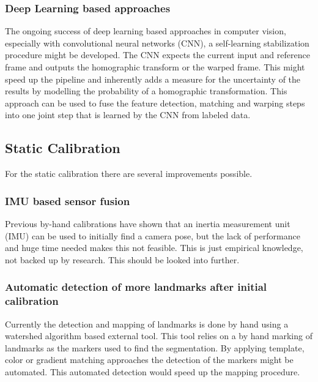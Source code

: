 \subsubsection{Deep Learning based approaches}
The ongoing success of deep learning based approaches in computer vision, especially with convolutional neural networks (CNN), a self-learning stabilization procedure might be developed.
The CNN expects the current input and reference frame and outputs the homographic transform or the warped frame. 
This might speed up the pipeline and inherently adds a measure for the uncertainty of the results by modelling the probability of a homographic transformation.
This approach can be used to fuse the feature detection, matching and warping steps into one joint step that is learned by the CNN from labeled data.


\subsection{Static Calibration}
For the static calibration there are several improvements possible.

\subsubsection{IMU based sensor fusion}
Previous by-hand calibrations have shown that an inertia measurement unit (IMU) can be used to initially find a camera pose, but the lack of performance and huge time needed makes this not feasible.
This is just empirical knowledge, not backed up by research. 
This should be looked into further.


\subsubsection{Automatic detection of more landmarks after initial calibration}
\label{sec:auto_detection_landmarks}
Currently the detection and mapping of landmarks is done by hand using a watershed algorithm \cite{meyer1992color,opencv_library} based external tool.
This tool relies on a by hand marking of landmarks as the markers used to find the segmentation.
By applying template, color or gradient matching approaches the detection of the markers might be automated.
This automated detection would speed up the mapping procedure. 


